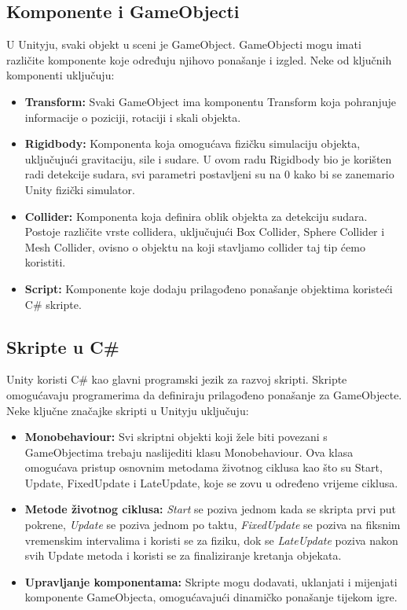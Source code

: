 \documentclass[diplomskirad]{fer}
\begin{document}
    \subsection{Komponente i GameObjecti}\label{subsec:komponente-i-gameobjecti}
    U Unityju, svaki objekt u sceni je GameObject.
    GameObjecti mogu imati različite komponente koje određuju njihovo ponašanje i izgled.
    Neke od ključnih komponenti uključuju:
    \begin{itemize}
        \item \textbf{Transform:} Svaki GameObject ima komponentu Transform koja pohranjuje informacije o poziciji, rotaciji i skali objekta.
        \item \textbf{Rigidbody:} Komponenta koja omogućava fizičku simulaciju objekta, uključujući gravitaciju, sile i sudare.
        U ovom radu Rigidbody bio je korišten radi detekcije sudara, svi parametri postavljeni su na 0 kako bi se zanemario Unity fizički simulator.
        \item \textbf{Collider:} Komponenta koja definira oblik objekta za detekciju sudara.
        Postoje različite vrste collidera, uključujući Box Collider, Sphere Collider i Mesh Collider, ovisno o objektu na koji stavljamo collider taj tip ćemo koristiti.
        \item \textbf{Script:} Komponente koje dodaju prilagođeno ponašanje objektima koristeći C\# skripte.
    \end{itemize}

    \subsection{Skripte u C\#}\label{subsec:skripte-u-c}
    Unity koristi C\# kao glavni programski jezik za razvoj skripti.
    Skripte omogućavaju programerima da definiraju prilagođeno ponašanje za GameObjecte.
    Neke ključne značajke skripti u Unityju uključuju:
    \begin{itemize}
        \item \textbf{Monobehaviour:} Svi skriptni objekti koji žele biti povezani s GameObjectima trebaju naslijediti klasu Monobehaviour.
        Ova klasa omogućava pristup osnovnim metodama životnog ciklusa kao što su Start, Update, FixedUpdate i LateUpdate, koje se zovu u određeno vrijeme ciklusa.
        \item \textbf{Metode životnog ciklusa:} \textit{Start} se poziva jednom kada se skripta prvi put pokrene, \textit{Update} se poziva jednom po taktu, \textit{FixedUpdate} se poziva na fiksnim vremenskim intervalima i koristi se za fiziku, dok se \textit{LateUpdate} poziva nakon svih Update metoda i koristi se za finaliziranje kretanja objekata.
        \item \textbf{Upravljanje komponentama:} Skripte mogu dodavati, uklanjati i mijenjati komponente GameObjecta, omogućavajući dinamičko ponašanje tijekom igre.
    \end{itemize}
\end{document}
